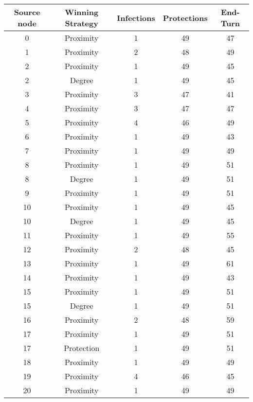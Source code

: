 \documentclass[results.tex]{subfiles}
\begin{document}
\begin{center}
  \begin{tabular}{| c || c | c | c | c |}
    \hline
    {\bfseries Source node} & {\bfseries Winning Strategy} & {\bfseries Infections} & {\bfseries Protections} & {\bfseries End-Turn} \\  %
    \hline\hline
    0 & Proximity & 1 & 49 & 47 \\ 
    \hline
    1 & Proximity & 2 & 48 & 49 \\ 
    \hline
    2 & Proximity & 1 & 49 & 45 \\ 
    \hline
    2 & Degree & 1 & 49 & 45 \\ 
    \hline
    3 & Proximity & 3 & 47 & 41 \\ 
    \hline
    4 & Proximity & 3 & 47 & 47 \\ 
    \hline
    5 & Proximity & 4 & 46 & 49 \\ 
    \hline
    6 & Proximity & 1 & 49 & 43 \\ 
    \hline
    7 & Proximity & 1 & 49 & 49 \\ 
    \hline
    8 & Proximity & 1 & 49 & 51 \\ 
    \hline
    8 & Degree & 1 & 49 & 51 \\ 
    \hline
    9 & Proximity & 1 & 49 & 51 \\ 
    \hline
    10 & Proximity & 1 & 49 & 45 \\ 
    \hline
    10 & Degree & 1 & 49 & 45 \\ 
    \hline
    11 & Proximity & 1 & 49 & 55 \\ 
    \hline
    12 & Proximity & 2 & 48 & 45 \\ 
    \hline
    13 & Proximity & 1 & 49 & 61 \\ 
    \hline
    14 & Proximity & 1 & 49 & 43 \\ 
    \hline
    15 & Proximity & 1 & 49 & 51 \\ 
    \hline
    15 & Degree & 1 & 49 & 51 \\ 
    \hline
    16 & Proximity & 2 & 48 & 59 \\ 
    \hline
    17 & Proximity & 1 & 49 & 51 \\ 
    \hline
    17 & Protection & 1 & 49 & 51 \\ 
    \hline
    18 & Proximity & 1 & 49 & 49 \\ 
    \hline
    19 & Proximity & 4 & 46 & 45 \\ 
    \hline
    20 & Proximity & 1 & 49 & 49 \\ 

\end{tabular}
\end{center}
\end{document}
